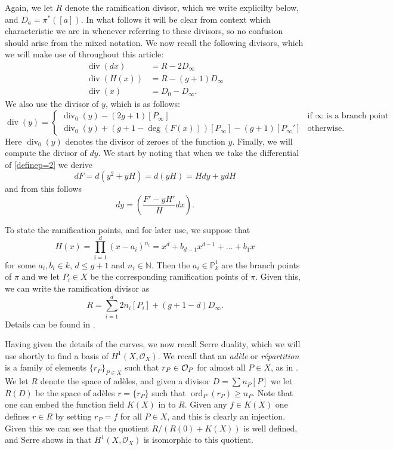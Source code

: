 \documentclass[draft, 11pt]{article} %
\theoremstyle{plain}
\theoremstyle{remark}
\newcommand{\cO}{{\cal O}}
\newcommand{\hone}{H^1(X,\mathcal{O}_X)}
\DeclareMathOperator{\ord}{ord}
\DeclareMathOperator{\di}{div}
\begin{document}
Again, we let $R$ denote the ramification divisor, which we write explicilty below, and $D_a = \pi^*([a])$.
In what follows it will be clear from context which characteristic we are in whenever referring to these divisors, so no confusion should arise from the mixed notation.
We now recall the following divisors, which we will make use of throughout this article:
\begin{align}
\di (dx) & = R - 2D_\infty \label{divdxp=2}\\
\di (H(x)) & = R - (g+1)D_\infty \label{divhp=2}\\
\di (x) & = D_0 - D_\infty \label{divxp=2}.
\end{align}
We also use the divisor of $y$, which is as follows:
\begin{equation}\label{divyp=2}
\di(y) = \begin{cases}
 \di_0(y) -(2g+1)[P_\infty] & \text{if $\infty$ is a branch point} \\
 \di_0(y) +(g+1-\deg(F(x)))[P_\infty] - (g+1)[P_\infty'] & \text{otherwise.}
\end{cases}
\end{equation}
Here $\di_0(y)$ denotes the divisor of zeroes of the function $y$.
Finally, we will compute the divisor of $dy$.
We start by noting that when we take the differential of \eqref{definep=2} we derive
\[
dF = d\left(y^2 + yH \right) = d(yH) = Hdy + ydH
\]
and from this follows 
\begin{equation}\label{divdyp=2}
dy = \left(\frac{F'-yH'}{H}dx\right).
\end{equation}


To state the ramification points, and for later use, we suppose that 
\begin{equation}\label{hcoefficients}
H(x) = \prod_{i=1}^d (x-a_i)^{n_i} = x^d + b_{d-1}x^{d-1} + \ldots + b_1x
\end{equation}
for some $a_i, b_i \in  k$, $d \leq g+1$ and $n_i \in \mathbb N$.
Then the $a_i \in \mathbb P_k^1$ are the branch points of $\pi$ and we let $P_i \in X$ be the corresponding ramification points of $\pi$.
Given this, we can write the ramification divisor as
\[
R = \sum_{i=1}^d 2n_i[P_i] + (g+1-d)D_\infty.
\]
Details can be found in \cite[\S 6]{faithfulaction}.

Having given the details of the curves, we now recall Serre duality, which we will use shortly to find a basis of $\hone$.
We recall that an {\sl ad\`ele} or {\sl r\'epartition} is a family of elements $\{r_P\}_{P\in X}$ such that $r_P \in \cO_P$ for almost all $P\in X$, as in \cite[Chap. II, \S 5]{algebraicgroupsandclassfields}.
We let $R$ denote the space of ad\`eles, and given a divisor $D = \sum n_P[P]$ we let $R(D)$ be the space of ad\`eles $r = \{r_P\}$ such that $\ord_P(r_P) \geq n_P$.
Note that one can embed the function field $K(X)$ in to $R$.
Given any $f \in K(X)$ one defines $r \in R$ by setting $r_P = f$ for all $P \in X$, and this is clearly an injection.
Given this we can see that the quotient $R/(R(0) + K(X))$ is well defined, and Serre shows in \cite[Prop. 3, Chap II]{algebraicgroupsandclassfields} that $\hone$ is isomorphic to this quotient.
\end{document}
